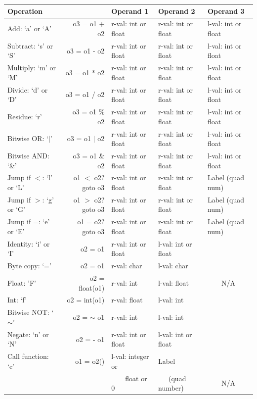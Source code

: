 \documentclass[12pt]{article}
\begin{document}
\begin{tabular}{ | l r | l | l | l | }
    \hline
     Operation & & Operand 1 & Operand 2 & Operand 3 \\ \hline
     Add: `a' or `A'  & o3 = o1 + o2 & r-val: int or float &  r-val: int or float  &  l-val: int or float \\
     Subtract: `s' or `S'  & o3 = o1 - o2 & r-val: int or float &  r-val: int or float  &  l-val: int or float \\
     Multiply: `m' or `M'  & o3 = o1 * o2 & r-val: int or float &  r-val: int or float  &  l-val: int or float \\
     Divide: `d' or `D'  & o3 = o1 / o2 & r-val: int or float &  r-val: int or float  &  l-val: int or float \\
     Residue: `r'  & o3 = o1 \% o2 & r-val: int or float &  r-val: int or float  &  l-val: int or float \\
     Bitwise OR: `$|$'  & o3 = o1 $|$ o2 & r-val: int or float &  r-val: int or float  &  l-val: int or float \\
     Bitwise AND: `\&'  & o3 = o1 \& o2 & r-val: int or float &  r-val: int or float  &  l-val: int or float \\
     Jump if $<$: `l' or `L'  & o1 $<$ o2? goto o3 & r-val: int or float &  r-val: int or float  &  Label (quad num) \\
     Jump if $>$: `g' or `G'  & o1 $>$ o2? goto o3 & r-val: int or float &  r-val: int or float  & Label (quad num) \\
     Jump if =: `e' or `E'  & o1 = o2? goto o3 & r-val: int or float &  r-val: int or float  &  Label (quad num) \\
     \hline
    Identity: `i' or `I'  & o2 = o1 & r-val: int or float &  l-val: int or float  &   \\
    Byte copy: `='  & o2 = o1 & r-val: char &  l-val: char  &   \\
    Float: 'F'  & o2 = float(o1) & r-val: int &  l-val: float  & {\large \ \ \ \ N/A} \\
    Int: `f'  & o2 = int(o1) & r-val: float &  l-val: int & \\
    Bitwise NOT: `$\sim$'  & o2 = $\sim$ o1 & r-val: int &  l-val: int &  \\
    Negate: `n' or `N'  & o2 = - o1 & r-val: int or float &  l-val: int or float  & \\
    \hline
    Call function: `c' & o1 = o2() & l-val: integer or &  Label & \\
      &   & \ \ \ \ float or 0 &\ \ \ (quad number)   & {\large \ \ \ \ N/A} \\

\end{tabular}
\end{document}

